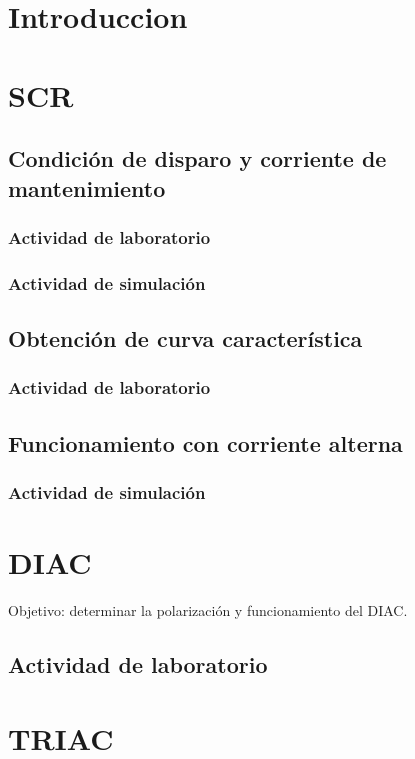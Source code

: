 \documentclass[chaptersright]{informeutn}
\begin{document}
\maketitle
\tableofcontents

\chapter{Introduccion}

\chapter{SCR}
\section{Condición de disparo y corriente de mantenimiento}
\subsection{Actividad de laboratorio}
\subsection{Actividad de simulación}
\section{Obtención de curva característica}
\subsection{Actividad de laboratorio}
\section{Funcionamiento con corriente alterna}
\subsection{Actividad de simulación}

\chapter{DIAC}
Objetivo: determinar la polarización y funcionamiento del DIAC.
\section{Actividad de laboratorio}

\chapter{TRIAC}
\end{document}
